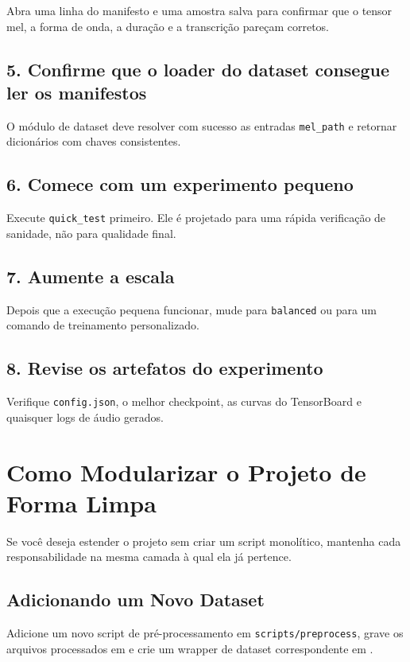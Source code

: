 \documentclass[11pt]{article}
\newcommand{\pathtt}[1]{\texttt{#1}}
\begin{document}
Abra uma linha do manifesto e uma amostra salva para confirmar que o tensor mel, a forma de onda, a duração e a transcrição pareçam corretos.

\subsection{5. Confirme que o loader do dataset consegue ler os manifestos}

O módulo de dataset deve resolver com sucesso as entradas \pathtt{mel\_path} e retornar dicionários com chaves consistentes.

\subsection{6. Comece com um experimento pequeno}

Execute \pathtt{quick\_test} primeiro. Ele é projetado para uma rápida verificação de sanidade, não para qualidade final.

\subsection{7. Aumente a escala}

Depois que a execução pequena funcionar, mude para \pathtt{balanced} ou para um comando de treinamento personalizado.

\subsection{8. Revise os artefatos do experimento}

Verifique \pathtt{config.json}, o melhor checkpoint, as curvas do TensorBoard e quaisquer logs de áudio gerados.

\section{Como Modularizar o Projeto de Forma Limpa}

Se você deseja estender o projeto sem criar um script monolítico, mantenha cada responsabilidade na mesma camada à qual ela já pertence.

\subsection{Adicionando um Novo Dataset}

Adicione um novo script de pré-processamento em \pathtt{scripts/preprocess}, grave os arquivos processados em  e crie um wrapper de dataset correspondente em .
\end{document}
